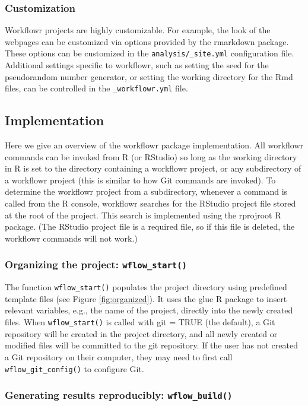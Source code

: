 \documentclass[9pt,a4paper]{extarticle}
\begin{document}
\subsubsection*{Customization}

Workflowr projects are highly customizable. For example, the look of the
webpages can be customized via options provided by the rmarkdown
package. These options can be customized in the
\verb|analysis/_site.yml| configuration file. Additional settings
specific to workflowr, such as setting the seed for the pseudorandom
number generator, or setting the working directory for the Rmd files,
can be controlled in the \verb|_workflowr.yml| file.

\subsection*{Implementation}

Here we give an overview of the workflowr package implementation. All workflowr commands can be invoked from R (or RStudio) so long as the working directory in R is set to the directory containing a workflowr project, or any subdirectory of a workflowr project (this is similar to how Git commands are invoked). To determine the workflowr project from a subdirectory, whenever a command is called from the R console, workflowr searches for the RStudio project file stored at the root of the project. This search is implemented using the rprojroot R package. (The RStudio project file is a required file, so if this file is deleted, the workflowr commands will not work.)

\subsubsection*{Organizing the project: \texttt{wflow\_start()}}

The function \texttt{wflow\_start()} populates the project directory using
predefined template files (see Figure \ref{fig:organized}). It uses the glue R package to
insert relevant variables, e.g., the name of the project, directly into
the newly created files. When \texttt{wflow\_start()} is called with git = TRUE
(the default), a Git repository will be created in the project
directory, and all newly created or modified files will be committed to
the git repository. If the user has not created a Git repository on
their computer, they may need to first call \texttt{wflow\_git\_config()} to
configure Git.

\subsubsection*{Generating results reproducibly: \texttt{wflow\_build()}}
\end{document}
